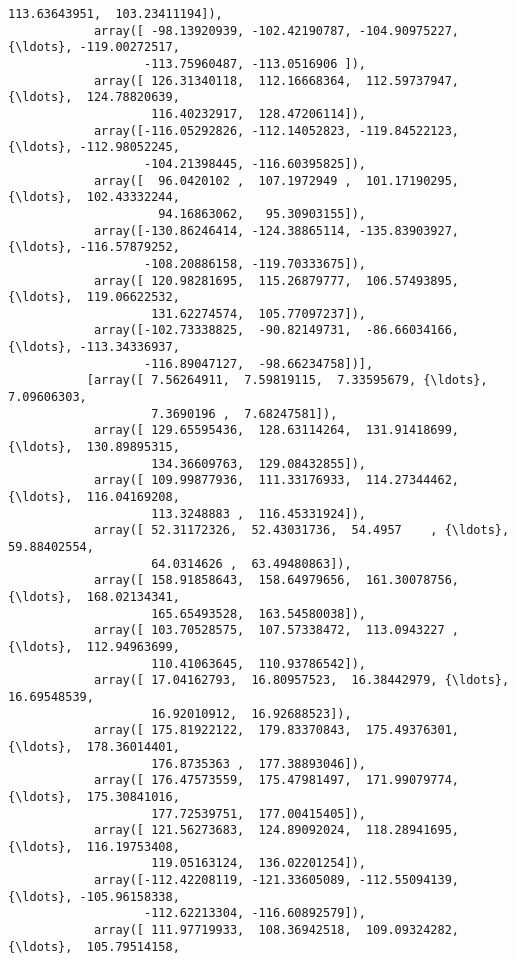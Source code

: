 \documentclass[11pt]{article}
\begin{document}
\begin{Verbatim}[commandchars=\\\{\}]
                    113.63643951,  103.23411194]),
            array([ -98.13920939, -102.42190787, -104.90975227, {\ldots}, -119.00272517,
                   -113.75960487, -113.0516906 ]),
            array([ 126.31340118,  112.16668364,  112.59737947, {\ldots},  124.78820639,
                    116.40232917,  128.47206114]),
            array([-116.05292826, -112.14052823, -119.84522123, {\ldots}, -112.98052245,
                   -104.21398445, -116.60395825]),
            array([  96.0420102 ,  107.1972949 ,  101.17190295, {\ldots},  102.43332244,
                     94.16863062,   95.30903155]),
            array([-130.86246414, -124.38865114, -135.83903927, {\ldots}, -116.57879252,
                   -108.20886158, -119.70333675]),
            array([ 120.98281695,  115.26879777,  106.57493895, {\ldots},  119.06622532,
                    131.62274574,  105.77097237]),
            array([-102.73338825,  -90.82149731,  -86.66034166, {\ldots}, -113.34336937,
                   -116.89047127,  -98.66234758])],
           [array([ 7.56264911,  7.59819115,  7.33595679, {\ldots},  7.09606303,
                    7.3690196 ,  7.68247581]),
            array([ 129.65595436,  128.63114264,  131.91418699, {\ldots},  130.89895315,
                    134.36609763,  129.08432855]),
            array([ 109.99877936,  111.33176933,  114.27344462, {\ldots},  116.04169208,
                    113.3248883 ,  116.45331924]),
            array([ 52.31172326,  52.43031736,  54.4957    , {\ldots},  59.88402554,
                    64.0314626 ,  63.49480863]),
            array([ 158.91858643,  158.64979656,  161.30078756, {\ldots},  168.02134341,
                    165.65493528,  163.54580038]),
            array([ 103.70528575,  107.57338472,  113.0943227 , {\ldots},  112.94963699,
                    110.41063645,  110.93786542]),
            array([ 17.04162793,  16.80957523,  16.38442979, {\ldots},  16.69548539,
                    16.92010912,  16.92688523]),
            array([ 175.81922122,  179.83370843,  175.49376301, {\ldots},  178.36014401,
                    176.8735363 ,  177.38893046]),
            array([ 176.47573559,  175.47981497,  171.99079774, {\ldots},  175.30841016,
                    177.72539751,  177.00415405]),
            array([ 121.56273683,  124.89092024,  118.28941695, {\ldots},  116.19753408,
                    119.05163124,  136.02201254]),
            array([-112.42208119, -121.33605089, -112.55094139, {\ldots}, -105.96158338,
                   -112.62213304, -116.60892579]),
            array([ 111.97719933,  108.36942518,  109.09324282, {\ldots},  105.79514158,

\end{Verbatim}
\end{document}
